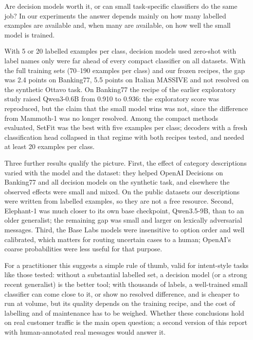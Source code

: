 Are decision models worth it, or can small task-specific classifiers do the same job? In our experiments the answer depends
mainly on how many labelled examples are available and, when many are available, on how well the small model is trained.

With 5 or 20 labelled examples per class, decision models used zero-shot with label names only were far ahead of every compact
classifier on all datasets. With the full training sets (70--190 examples per class) and our frozen recipes, the gap was 2.4 points on
Banking77, 5.5 points on Italian MASSIVE and not resolved on the synthetic Ottavo task. On Banking77 the recipe of the earlier exploratory
study raised Qwen3-0.6B from 0.910 to 0.936: the exploratory score was reproduced, but the claim that the small model wins was not, since
the difference from Mammoth-1 was no longer resolved. Among the compact methods evaluated, SetFit was the best with five examples per
class; decoders with a fresh classification head collapsed in that regime with both recipes tested, and needed at least 20 examples per
class.

Three further results qualify the picture. First, the effect of category descriptions varied with the model and the dataset: they helped
OpenAI Decisions on Banking77 and all decision models on the synthetic task, and elsewhere the observed effects were small and mixed. On the
public datasets our descriptions were written from labelled examples, so they are not a free resource. Second, Elephant-1 was much closer
to its own base checkpoint, Qwen3.5-9B, than to an older generalist; the remaining gap was small and larger on lexically adversarial
messages. Third, the Base Labs models were insensitive to option order and well calibrated, which matters for routing uncertain cases to a
human; OpenAI's coarse probabilities were less useful for that purpose.

For a practitioner this suggests a simple rule of thumb, valid for intent-style tasks like those tested: without a substantial labelled set,
a decision model (or a strong recent generalist) is the better tool; with thousands of labels, a well-trained small classifier can come close
to it, or show no resolved difference, and is cheaper to run at volume, but its quality depends on the training recipe, and the cost of
labelling and of maintenance has to be weighed. Whether these conclusions hold on real customer traffic is the main open question; a second
version of this report with human-annotated real messages would answer it.
